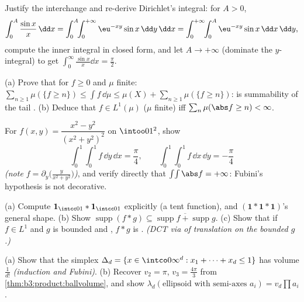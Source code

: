 \begin{exercise}[$\star$]\label{exo:b3:product:2}
Justify the interchange and re-derive Dirichlet's integral: for
$A > 0$,
\[
\int_0^A\frac{\sin x}x\,\dd x
= \int_0^A\!\!\int_0^{+\infty}\eu^{-xy}\sin x\,\dd y\,\dd x
= \int_0^{+\infty}\!\!\int_0^A \eu^{-xy}\sin x\,\dd x\,\dd y,
\]
compute the inner integral in closed form, and let $A \to
+\infty$ (dominate the $y$-integral) to get
$\int_0^\infty\frac{\sin x}x\dd x = \frac\pi2$.
\end{exercise}

\begin{exercise}[$\star\star$]\label{exo:b3:product:3}
(a) Prove that for $f \geq 0$  and $\mu$ finite:
$\sum_{n\geq1}\mu(\{f \geq n\}) \leq \int f\,\dd\mu \leq
\mu(X) + \sum_{n\geq1}\mu(\{f\geq n\})$:  is
summability of the tail .
(b) Deduce that $f \in L^1(\mu)$ ($\mu$ finite) iff
$\sum_n\mu(\abs f \geq n) < \infty$.
\end{exercise}

\begin{exercise}[$\star\star$]\label{exo:b3:product:4}
For $f(x, y) = \dfrac{x^2 - y^2}{(x^2 + y^2)^2}$ on
$\intoo01^2$, show
\[
\int_0^1\!\!\int_0^1 f\,\dd y\,\dd x = \frac\pi4,
\qquad
\int_0^1\!\!\int_0^1 f\,\dd x\,\dd y = -\frac\pi4
\]
\emph{(note $f = \partial_y\bigl(\frac{y}{x^2+y^2}\bigr)$)},
and verify directly that $\int\!\int\abs f = +\infty$: Fubini's
 hypothesis is not decorative.
\end{exercise}

\begin{exercise}[$\star\star$]\label{exo:b3:product:5}
(a) Compute $\mathbf 1_{\intcc01} * \mathbf 1_{\intcc01}$
explicitly (a tent function), and $(\mathbf 1 * \mathbf 1 *
\mathbf 1)$'s general shape.
(b) Show $\operatorname{supp}(f * g) \subseteq
\overline{\operatorname{supp}f + \operatorname{supp}g}$.
(c) Show that if $f \in L^1$ and $g$ is bounded and ,
$f * g$ is . \emph{(DCT via  of
translation on the bounded $g$.)}
\end{exercise}

\begin{exercise}[$\star\star$]\label{exo:b3:product:6}
(a) Show that the simplex $\Delta_d = \{x \in \intco0\infty^d
: x_1 + \dots + x_d \leq 1\}$ has volume $\frac1{d!}$
\emph{(induction and Fubini)}.
(b) Recover $v_2 = \pi$, $v_3 = \frac{4\pi}3$ from
\cref{thm:b3:product:ballvolume}, and show
$\lambda_d(\text{ellipsoid with semi-axes } a_i) =
v_d\prod a_i$.
\end{exercise}

